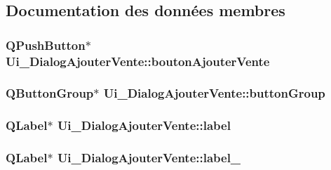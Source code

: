 \subsection{Documentation des données membres}
\hypertarget{class_ui___dialog_ajouter_vente_a9b3dc0fa96393ccf69a41ae7776da8df}{
\subsubsection[{bouton\-Ajouter\-Vente}]{\setlength{\rightskip}{0pt plus 5cm}Q\-Push\-Button$\ast$ Ui\-\_\-\-Dialog\-Ajouter\-Vente\-::bouton\-Ajouter\-Vente}}\label{class_ui___dialog_ajouter_vente_a9b3dc0fa96393ccf69a41ae7776da8df}
\hypertarget{class_ui___dialog_ajouter_vente_a7814de48092bce095428664bda3373d3}{
\subsubsection[{button\-Group}]{\setlength{\rightskip}{0pt plus 5cm}Q\-Button\-Group$\ast$ Ui\-\_\-\-Dialog\-Ajouter\-Vente\-::button\-Group}}\label{class_ui___dialog_ajouter_vente_a7814de48092bce095428664bda3373d3}
\hypertarget{class_ui___dialog_ajouter_vente_a0148c009801a386f05f72bb1eb85138a}{
\subsubsection[{label}]{\setlength{\rightskip}{0pt plus 5cm}Q\-Label$\ast$ Ui\-\_\-\-Dialog\-Ajouter\-Vente\-::label}}\label{class_ui___dialog_ajouter_vente_a0148c009801a386f05f72bb1eb85138a}
\hypertarget{class_ui___dialog_ajouter_vente_a3288030f764fff68a7e443c490fe969d}{
\subsubsection[{label\-\_\-6}]{\setlength{\rightskip}{0pt plus 5cm}Q\-Label$\ast$ Ui\-\_\-\-Dialog\-Ajouter\-Vente\-::label\-\_}}\label{class_ui___dialog_ajouter_vente_a3288030f764fff68a7e443c490fe969d}
